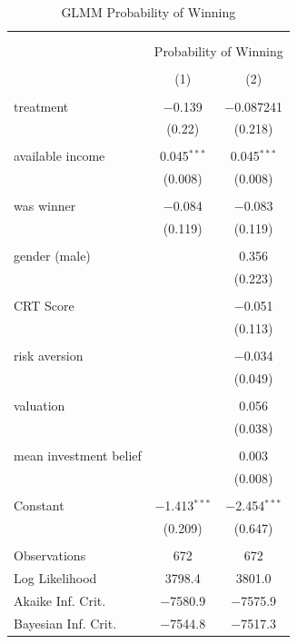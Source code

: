 \begin{table}[!htbp] \centering 
  \caption{GLMM Probability of Winning} 
  \label{tab:glm_prob} 
\begin{tabular}{@{\extracolsep{5pt}}lcc} 
\\[-1.8ex]\hline 
\hline \\[-1.8ex] 
\\[-1.8ex] & \multicolumn{2}{c}{Probability of Winning} \\ 
\\[-1.8ex] & (1) & (2)\\ 
\hline \\[-1.8ex] 
 treatment & $-$0.139 &  $-$0.087241 \\ 
  & (0.22) & (0.218) \\ 
  & & \\ 
 available income & 0.045$^{***}$ & 0.045$^{***}$ \\ 
  & (0.008) & (0.008) \\ 
  & & \\ 
 was winner & $-$0.084 &  $-$0.083 \\ 
  & (0.119) & (0.119) \\ 
  & & \\ 
 gender (male) &  & 0.356 \\ 
  &  & (0.223) \\ 
  & & \\ 
 CRT Score &  & $-$0.051 \\ 
  &  & (0.113) \\ 
  & & \\ 
 risk aversion & & $-$0.034 \\ 
  &  & (0.049) \\ 
  & & \\ 
 valuation &  & 0.056 \\ 
  &  & (0.038) \\ 
  & & \\ 
 mean investment belief &  & 0.003 \\ 
  &  & (0.008) \\ 
  & & \\ 
 Constant & $-$1.413$^{***}$ & $-$2.454$^{***}$ \\ 
  & (0.209) & (0.647) \\ 
  & & \\ 
  \hline
Observations & 672 & 672 \\ 
Log Likelihood & 3798.4 & 3801.0 \\ 
Akaike Inf. Crit. & $-$7580.9 & $-$7575.9 \\ 
Bayesian Inf. Crit. & $-$7544.8 & $-$7517.3 \\

\end{tabular}
\end{table}
